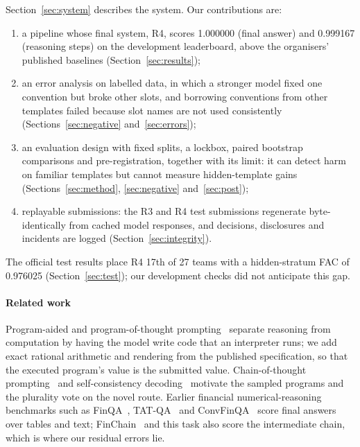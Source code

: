 \documentclass[conference]{IEEEtran}
\begin{document}
Section~\ref{sec:system} describes the system. Our contributions are:
\begin{enumerate}
\item a pipeline whose final system, R4, scores 1.000000 (final answer) and 0.999167 (reasoning steps) on the development leaderboard, above the organisers' published baselines (Section~\ref{sec:results});
\item an error analysis on labelled data, in which a stronger model fixed one convention but broke other slots, and borrowing conventions from other templates failed because slot names are not used consistently (Sections~\ref{sec:negative} and~\ref{sec:errors});
\item an evaluation design with fixed splits, a lockbox, paired bootstrap comparisons and pre-registration, together with its limit: it can detect harm on familiar templates but cannot measure hidden-template gains (Sections~\ref{sec:method}, \ref{sec:negative} and~\ref{sec:post});
\item replayable submissions: the R3 and R4 test submissions regenerate byte-identically from cached model responses, and decisions, disclosures and incidents are logged (Section~\ref{sec:integrity}).
\end{enumerate}
The official test results place R4 17th of 27 teams with a hidden-stratum FAC of 0.976025 (Section~\ref{sec:test}); our development checks did not anticipate this gap.

\paragraph*{Related work}
Program-aided and program-of-thought prompting~\cite{gao2023palprogramaidedlanguagemodels,chen2023programthoughtspromptingdisentangling} separate reasoning from computation by having the model write code that an interpreter runs; we add exact rational arithmetic and rendering from the published specification, so that the executed program's value is the submitted value. Chain-of-thought prompting~\cite{NEURIPS2022_9d560961} and self-consistency decoding~\cite{wang2023selfconsistencyimproveschainthought} motivate the sampled programs and the plurality vote on the novel route. Earlier financial numerical-reasoning benchmarks such as FinQA~\cite{chen-etal-2021-finqa}, TAT-QA~\cite{zhu-etal-2021-tat} and ConvFinQA~\cite{chen-etal-2022-convfinqa} score final answers over tables and text; FinChain~\cite{xie-etal-2026-finchain} and this task also score the intermediate chain, which is where our residual errors lie.
\end{document}
